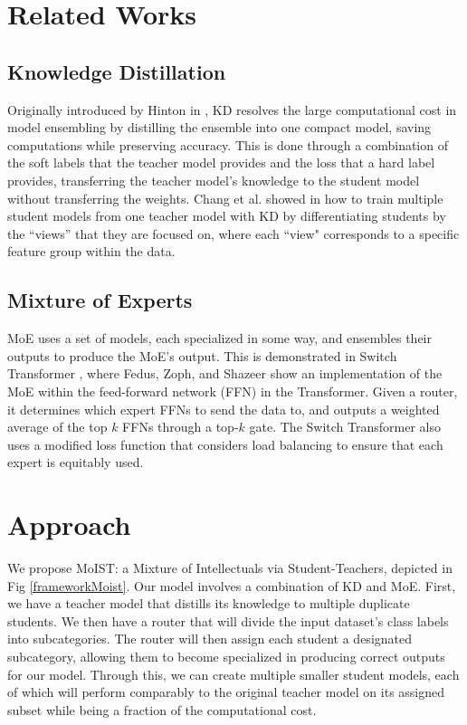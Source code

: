 \documentclass[conference]{IEEEtran}
\begin{document}
\section{Related Works}

\subsection{Knowledge Distillation}
Originally introduced by Hinton in \cite{hinton2015distillingknowledgeneuralnetwork}, KD resolves the large computational cost in model ensembling by distilling the ensemble into one compact model, saving computations while preserving accuracy. This is done through a combination of the soft labels that the teacher model provides and the loss that a hard label provides, transferring the teacher model's knowledge to the student model without transferring the weights. Chang et al. showed in \cite{chang-etal-2022-one} how to train multiple student models from one teacher model with KD by differentiating students by the ``views'' that they are focused on, where each ``view" corresponds to a specific feature group within the data.

\subsection{Mixture of Experts}
MoE uses a set of models, each specialized in some way, and ensembles their outputs to produce the MoE's output. This is demonstrated in Switch Transformer \cite{fedus2022switchtransformersscalingtrillion}, where Fedus, Zoph, and Shazeer show an implementation of the MoE within the feed-forward network (FFN) in the Transformer. Given a router, it determines which expert FFNs to send the data to, and outputs a weighted average of the top $k$ FFNs through a top-$k$ gate. The Switch Transformer also uses a modified loss function that considers load balancing to ensure that each expert is equitably used.

\section{Approach}

We propose MoIST: a Mixture of Intellectuals via Student-Teachers, depicted in Fig \ref{frameworkMoist}. Our model involves a combination of KD and MoE. First, we have a teacher model that distills its knowledge to multiple duplicate students. We then have a router that will divide the input dataset's class labels into subcategories. The router will then assign each student a designated subcategory, allowing them to become specialized in producing correct outputs for our model. Through this, we can create multiple smaller student models, each of which will perform comparably to the original teacher model on its assigned subset while being a fraction of the computational cost.
\end{document}
